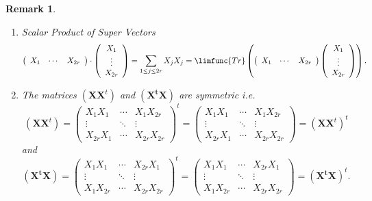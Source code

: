 \documentclass[aps,preprint]{revtex4}
\newtheorem{remark}[theorem]{Remark}
\begin{document}
\begin{remark}
\begin{enumerate}
\item Scalar Product of Super Vectors%
\begin{equation}
\left( 
\begin{array}{ccc}
X_{1} & \cdots & X_{2r}%
\end{array}%
\right) \cdot \left( 
\begin{array}{c}
X_{1} \\ 
\vdots \\ 
X_{2r}%
\end{array}%
\right) =\sum_{1\leq j\leq 2r}X_{j}X_{j}=\limfunc{Tr}\left( \left( 
\begin{array}{ccc}
X_{1} & \cdots & X_{2r}%
\end{array}%
\right) \left( 
\begin{array}{c}
X_{1} \\ 
\vdots \\ 
X_{2r}%
\end{array}%
\right) \right) .
\end{equation}

\item The matrices $\left( \boldsymbol{XX}^{t}\right) $ and $\left( 
\boldsymbol{X^{t}X}\right) $ are symmetric i.e. 
\begin{equation}
\left( \boldsymbol{XX}^{t}\right) =\left( 
\begin{array}{ccc}
X_{1}X_{1} & \cdots & X_{1}X_{2r} \\ 
\vdots & \ddots & \vdots \\ 
X_{2r}X_{1} & \cdots & X_{2r}X_{2r}%
\end{array}%
\right) ^{t}=\left( 
\begin{array}{ccc}
X_{1}X_{1} & \cdots & X_{1}X_{2r} \\ 
\vdots & \ddots & \vdots \\ 
X_{2r}X_{1} & \cdots & X_{2r}X_{2r}%
\end{array}%
\right) =\left( \boldsymbol{XX}^{t}\right) ^{t}
\end{equation}%
and 
\begin{equation}
\left( \boldsymbol{X^{t}X}\right) =\left( 
\begin{array}{ccc}
X_{1}X_{1} & \cdots & X_{2r}X_{1} \\ 
\vdots & \ddots & \vdots \\ 
X_{1}X_{2r} & \cdots & X_{2r}X_{2r}%
\end{array}%
\right) ^{t}=\left( 
\begin{array}{ccc}
X_{1}X_{1} & \cdots & X_{2r}X_{1} \\ 
\vdots & \ddots & \vdots \\ 
X_{1}X_{2r} & \cdots & X_{2r}X_{2r}%
\end{array}%
\right) =\left( \boldsymbol{X^{t}X}\right) ^{t}.
\end{equation}


\end{enumerate}
\end{remark}
\end{document}
